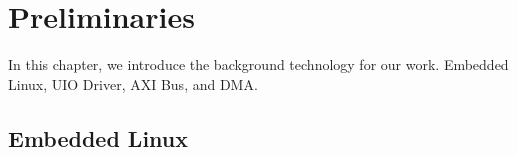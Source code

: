 \chapter{Preliminaries}
\label{cha:Preliminaries}
In this chapter, we introduce the background technology for our work. 
Embedded Linux, UIO Driver, AXI Bus, and DMA.



\section{Embedded Linux}
\label{sec:Embedded Linux}

